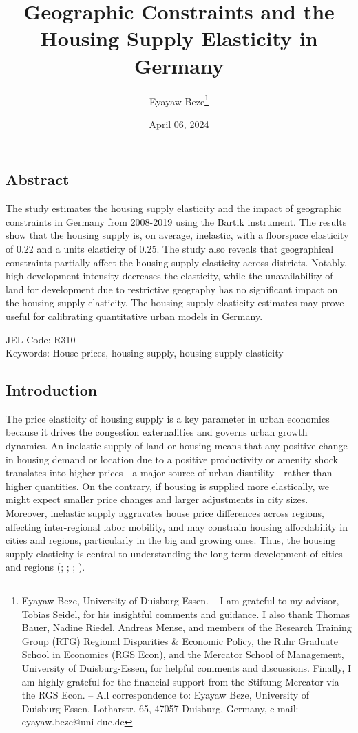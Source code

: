 \documentclass[
  12pt,
]{article}
\title{\textbf{Geographic Constraints and the Housing Supply Elasticity in Germany}}
\subtitle{\begin{center}
\href{https://uni-duisburg-essen.sciebo.de/s/km7tQzcygRQjwp6}{Click here for the latest version.}
\end{center}}
\author{Eyayaw Beze\footnote{Eyayaw Beze, University of Duisburg-Essen. -- I am grateful to my advisor, Tobias Seidel, for his insightful comments and guidance. I also thank Thomas Bauer, Nadine Riedel, Andreas Mense, and members of the Research Training Group (RTG) Regional Disparities \& Economic Policy, the Ruhr Graduate School in Economics (RGS Econ), and the Mercator School of Management, University of Duisburg-Essen, for helpful comments and discussions. Finally, I am highly grateful for the financial support from the Stiftung Mercator via the RGS Econ. -- All correspondence to: Eyayaw Beze, University of Duisburg-Essen, Lotharstr. 65, 47057 Duisburg, Germany, e-mail: eyayaw.beze@uni-due.de}}
\date{April 06, 2024}
\begin{document}
\maketitle





\subsection*{Abstract}\label{abstract}

The study estimates the housing supply elasticity and the impact of geographic constraints in Germany from 2008-2019 using the Bartik instrument. The results show that the housing supply is, on average, inelastic, with a floorspace elasticity of 0.22 and a units elasticity of 0.25. The study also reveals that geographical constraints partially affect the housing supply elasticity across districts. Notably, high development intensity decreases the elasticity, while the unavailability of land for development due to restrictive geography has no significant impact on the housing supply elasticity. The housing supply elasticity estimates may prove useful for calibrating quantitative urban models in Germany.

JEL-Code: R310\\
Keywords: House prices, housing supply, housing supply elasticity

\pagebreak

\subsection{Introduction}\label{introduction}

The price elasticity of housing supply is a key parameter in urban economics because it drives the congestion externalities and governs urban growth dynamics. An inelastic supply of land or housing means that any positive change in housing demand or location due to a positive productivity or amenity shock translates into higher prices---a major source of urban disutility---rather than higher quantities. On the contrary, if housing is supplied more elastically, we might expect smaller price changes and larger adjustments in city sizes. Moreover, inelastic supply aggravates house price differences across regions, affecting inter-regional labor mobility, and may constrain housing affordability in cities and regions, particularly in the big and growing ones. Thus, the housing supply elasticity is central to understanding the long-term development of cities and regions (; ; ; ).
\end{document}
